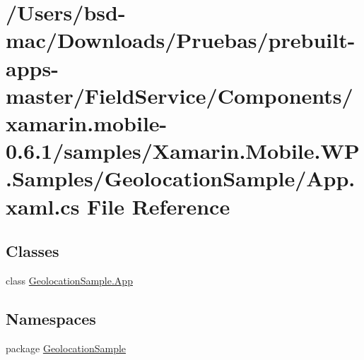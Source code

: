 \hypertarget{_components_2xamarin_8mobile-0_86_81_2samples_2_xamarin_8_mobile_8_w_p_8_samples_2_geolocation_sample_2_app_8xaml_8cs}{\section{/\+Users/bsd-\/mac/\+Downloads/\+Pruebas/prebuilt-\/apps-\/master/\+Field\+Service/\+Components/xamarin.mobile-\/0.6.1/samples/\+Xamarin.Mobile.\+W\+P.\+Samples/\+Geolocation\+Sample/\+App.xaml.\+cs File Reference}
\label{_components_2xamarin_8mobile-0_86_81_2samples_2_xamarin_8_mobile_8_w_p_8_samples_2_geolocation_sample_2_app_8xaml_8cs}
}
\subsection*{Classes}
\begin{DoxyCompactItemize}
\item 
class \hyperlink{class_geolocation_sample_1_1_app}{Geolocation\+Sample.\+App}
\end{DoxyCompactItemize}
\subsection*{Namespaces}
\begin{DoxyCompactItemize}
\item 
package \hyperlink{namespace_geolocation_sample}{Geolocation\+Sample}
\end{DoxyCompactItemize}
